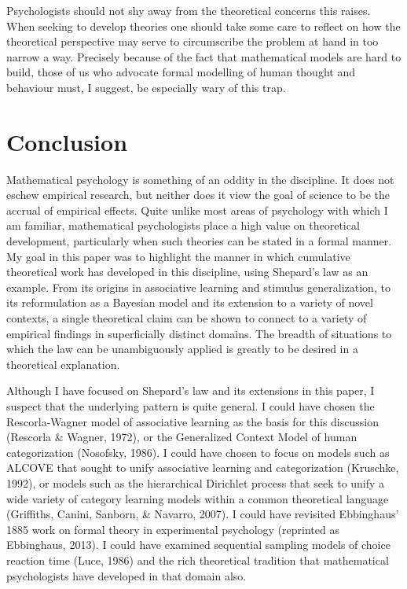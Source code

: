 \documentclass[
  english,
  doc]{apa6}
\begin{document}
\noindent
Psychologists should not shy away from the theoretical concerns this raises. When seeking to develop theories one should take some care to reflect on how the theoretical perspective may serve to circumscribe the problem at hand in too narrow a way. Precisely because of the fact that mathematical models are hard to build, those of us who advocate formal modelling of human thought and behaviour must, I suggest, be especially wary of this trap.

\hypertarget{conclusion}{%
\section{Conclusion}\label{conclusion}}

\noindent
Mathematical psychology is something of an oddity in the discipline. It does not eschew empirical research, but neither does it view the goal of science to be the accrual of empirical effects. Quite unlike most areas of psychology with which I am familiar, mathematical psychologists place a high value on theoretical development, particularly when such theories can be stated in a formal manner. My goal in this paper was to highlight the manner in which cumulative theoretical work has developed in this discipline, using Shepard's law as an example. From its origins in associative learning and stimulus generalization, to its reformulation as a Bayesian model and its extension to a variety of novel contexts, a single theoretical claim can be shown to connect to a variety of empirical findings in superficially distinct domains. The breadth of situations to which the law can be unambiguously applied is greatly to be desired in a theoretical explanation.

Although I have focused on Shepard's law and its extensions in this paper, I suspect that the underlying pattern is quite general. I could have chosen the Rescorla-Wagner model of associative learning as the basis for this discussion (Rescorla \& Wagner, 1972), or the Generalized Context Model of human categorization (Nosofsky, 1986). I could have chosen to focus on models such as ALCOVE that sought to unify associative learning and categorization (Kruschke, 1992), or models such as the hierarchical Dirichlet process that seek to unify a wide variety of category learning models within a common theoretical language (Griffiths, Canini, Sanborn, \& Navarro, 2007). I could have revisited Ebbinghaus' 1885 work on formal theory in experimental psychology (reprinted as Ebbinghaus, 2013). I could have examined sequential sampling models of choice reaction time (Luce, 1986) and the rich theoretical tradition that mathematical psychologists have developed in that domain also.
\end{document}

